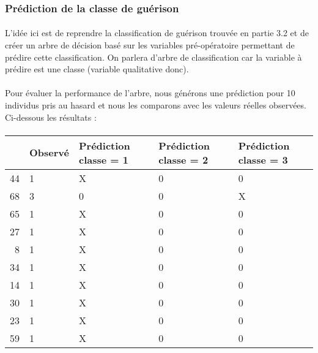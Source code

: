 \documentclass[11pt]{article}
\begin{document}
    
    \subsubsection{Prédiction de la classe de
guérison}\label{pruxe9diction-de-la-classe-de-guuxe9rison}

\paragraph{}
L'idée ici est de reprendre la classification de guérison trouvée en
partie 3.2 et de créer un arbre de décision basé sur les variables
pré-opératoire permettant de prédire cette classification. On parlera
d'arbre de classification car la variable à prédire est une classe
(variable qualitative donc).



    \begin{center}
    \end{center}
    
\paragraph{}    
Pour évaluer la performance de l'arbre, nous générons une prédiction
pour 10 individus pris au hasard et nous les comparons avec les valeurs
réelles observées. Ci-dessous les résultats :

\paragraph{}

    \begin{tabular}{r|llll}
  & Observé & Prédiction classe = 1 & Prédiction classe = 2 & Prédiction classe = 3\\
\hline
	44 & 1 & X & 0 & 0\\
	68 & 3 & 0 & 0 & X\\
	65 & 1 & X & 0 & 0\\
	27 & 1 & X & 0 & 0\\
	8 & 1 & X & 0 & 0\\
	34 & 1 & X & 0 & 0\\
	14 & 1 & X & 0 & 0\\
	30 & 1 & X & 0 & 0\\
	23 & 1 & X & 0 & 0\\
	59 & 1 & X & 0 & 0\\
\end{tabular}


    

    
    
    
    
\end{document}

